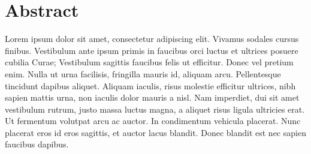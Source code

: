 \section*{Abstract}


Lorem ipsum dolor sit amet, consectetur adipiscing elit. Vivamus sodales cursus finibus. Vestibulum ante ipsum primis in faucibus orci luctus et ultrices posuere cubilia Curae; Vestibulum sagittis faucibus felis ut efficitur. Donec vel pretium enim. Nulla ut urna facilisis, fringilla mauris id, aliquam arcu. Pellentesque tincidunt dapibus aliquet. Aliquam iaculis, risus molestie efficitur ultrices, nibh sapien mattis urna, non iaculis dolor mauris a nisl. Nam imperdiet, dui sit amet vestibulum rutrum, justo massa luctus magna, a aliquet risus ligula ultricies erat. Ut fermentum volutpat arcu ac auctor. In condimentum vehicula placerat. Nunc placerat eros id eros sagittis, et auctor lacus blandit. Donec blandit est nec sapien faucibus dapibus.


